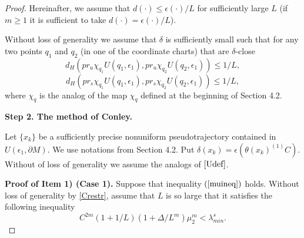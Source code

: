 \documentclass[11pt]{article}
\theoremstyle{Mystyle}
\begin{document}
\begin{proof}
Hereinafter, we assume that $d(\cdot)\leq \epsilon(\cdot)/L$ for sufficiently large $L$ (if $m\geq1$ it is sufficient to take $d(\cdot)=\epsilon(\cdot)/L$).



Without loss of generality we assume that $\delta$ is sufficiently small such that
for any two points $q_1$ and $q_2$ (in one of the coordinate charts) that are $\delta$-close
\begin{equation}
\label{zdef1}
d_H(pr_u\chi_{q_1}U(q_1,\epsilon_1),pr_u\chi_{q_2}U(q_2,\epsilon_1))\leq 1/L,
\end{equation}
\begin{equation}
\label{zdef2}
d_H(pr_s\chi_{q_1}U(q_1,\epsilon_1),pr_s\chi_{q_2}U(q_2,\epsilon_1))\leq 1/L,
\end{equation}
where $\chi_{q}$ is the analog of the map $\chi_{q}$ defined at the beginning of Section 4.2.

\textbf{Step 2. The method of Conley.}

Let $\{x_k\}$ be a sufficiently precise nonuniform pseudotrajectory contained in $U(\epsilon_1,\partial M)$. %
We use notations from Section 4.2.
Put $\delta(x_k) = \epsilon(\theta(x_k)^{(1)} C)$. Without of loss of generality we assume the analogs of $\eqref{Udef}$.


\textbf{Proof of Item 1) (Case 1).} Suppose that inequality $(\ref{muineq})$ holds. Without loss of generality by \eqref{Crestr}, assume that $L$ is so large that it satisfies the following inequality
\begin{equation}
\label{ineqL}
C^{2m}(1+1/L)(1+\Delta/L^m)\mu_2^m < \lambda^{s}_{min}.
\end{equation} 


\end{proof}
\end{document}

